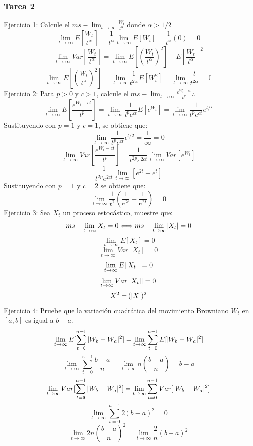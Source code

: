 \documentclass[11pt,fleqn]{book} %
\numberwithin{equation}{section} %
\numberwithin{figure}{section} %
\numberwithin{table}{section} %
\begin{document}
\subsubsection{Tarea 2}
Ejercicio 1: Calcule el $ms-\lim_{t \to \infty} \frac{W_{t}}{t^{\alpha}}$ donde $\alpha > 1/2$ 
$$ \lim_{t \to \infty} E[\frac{W_{t}}{t^{\alpha}}] = \frac{1}{t^{\alpha}} \lim_{t \to \infty} E[W_{t}] = \frac{1}{t^{\alpha}} (0) = 0 $$
$$ \lim_{t \to \infty} Var[\frac{W_{t}}{t^{\alpha}}] =  \lim_{t \to \infty} E[(\frac{W_{t}}{t^{\alpha}})^{2}] - E[\frac{W_{t}}{t^{\alpha}}]^{2}  $$
$$  \lim_{t \to \infty} E[(\frac{W_{t}}{t^{\alpha}})^{2}] = \lim_{t \to \infty} \frac{1}{t^{2\alpha}} E[W_{t}^{2}] = \lim_{t \to \infty} \frac{t}{t^{2\alpha}} = 0$$
Ejercicio 2: Para $p > 0$ y $c > 1$, calcule el $ms-\lim_{t \to \infty} \frac{e^{W_{t} - ct}}{t^{p}} \therefore$
$$ \lim_{t \to \infty} E[\frac{e^{W_{t} - ct}}{t^{p}}] = \lim_{t \to \infty} \frac{1}{t^{p} e^{ct}} E[e^{W_{t}}] = \lim_{t \to \infty} \frac{1}{t^{p} e^{ct}} e^{t/2}   $$
Sustituyendo con $p = 1$ y $c = 1 $, se obtiene que:
$$ \lim_{t \to \infty} \frac{1}{t^{p} e^{ct}} e^{t/2} = \frac{1}{\infty} = 0 $$
$$ \lim_{t \to \infty} Var[\frac{e^{W_{t} - ct}}{t^{p}}] = \frac{1}{t^{2p} e^{2ct}} \lim_{t \to \infty} Var[e^{W_{t}}]  $$
$$ \frac{1}{t^{2p} e^{2ct}} \lim_{t \to \infty} [e^{2t}-e^{t}] $$
Sustituyendo con $p=1$ y $c = 2$ se obtiene que:
$$ \lim_{t \to \infty} \frac{1}{t^{2}} (\frac{1}{e^{2t}} - \frac{1}{e^{3t}}) = 0 $$
Ejercicio 3: Sea $X_{t}$ un proceso estocástico, muestre que: 
$$ ms-\lim_{t \to \infty} X_{t} = 0 \Longleftrightarrow ms-\lim_{t \to \infty} \arrowvert X_{t} \arrowvert = 0 $$
$$ \lim_{t \to \infty} E[X_{t}] = 0 $$
$$ \lim_{t \to \infty} Var[X_{t}] = 0 $$
$$ \lim_{t \to \infty} E[\arrowvert X_{t} \arrowvert] = 0 $$
$$ \lim_{t \to \infty} Var[\arrowvert X_{t} \arrowvert] = 0 $$
$$ X^{2} = (\arrowvert X \arrowvert)^{2} $$
Ejercicio 4: Pruebe que la variación cuadrática del movimiento Browniano $W_{t}$ en $[a,b]$ es igual a $b-a$.
$$ \lim_{t \to \infty} E[\sum_{t=0}^{n-1} \arrowvert W_{b} - W_{a} \arrowvert ^{2}] = \lim_{t \to \infty} \sum_{t=0}^{n-1} E[ \arrowvert W_{b} - W_{a} \arrowvert ^{2}]  $$
$$ \lim_{t \to \infty} \sum_{t=0}^{n-1} \frac{b-a}{n} = \lim_{t \to \infty} n(\frac{b-a}{n}) = b-a   $$
$$ \lim_{t \to \infty} Var[\sum_{t=0}^{n-1} \arrowvert W_{b} - W_{a} \arrowvert ^{2}] = \lim_{t \to \infty} \sum_{t=0}^{n-1} Var[ \arrowvert W_{b} - W_{a} \arrowvert ^{2}]  $$
$$ \lim_{t \to \infty} \sum_{t=0}^{n-1} 2(b-a)^{2} = 0 $$
$$ \lim_{t \to \infty} 2n(\frac{b-a}{n})^2 = \lim_{t \to \infty} \frac{2}{n}(b-a)^2 $$
\end{document}
